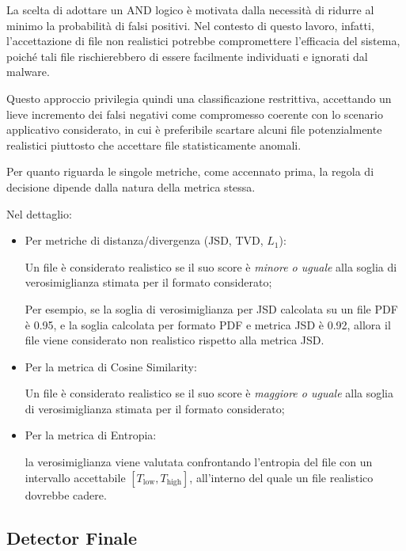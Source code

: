 \documentclass{report}
\begin{document}
\bigskip

La scelta di adottare un AND logico è motivata dalla necessità di ridurre al minimo la probabilità di falsi positivi.
Nel contesto di questo lavoro, infatti, l’accettazione di file non realistici potrebbe
compromettere l’efficacia del sistema, poiché tali file rischierebbero di essere facilmente individuati
e ignorati dal malware.

\bigskip

Questo approccio privilegia quindi una classificazione restrittiva, accettando un lieve incremento dei falsi negativi
come compromesso coerente con lo scenario applicativo considerato, in cui è preferibile scartare alcuni file
potenzialmente realistici piuttosto che accettare file statisticamente anomali.


\bigskip

Per quanto riguarda le singole metriche, come accennato prima, la regola di decisione dipende dalla natura della metrica stessa.

Nel dettaglio:
\begin{itemize}

    \item Per metriche di distanza/divergenza (JSD, TVD, $L_1$):

Un file è considerato realistico se il suo score è \emph{minore o uguale} alla soglia di
verosimiglianza stimata per il formato considerato;

Per esempio, se la soglia di verosimiglianza per JSD calcolata su un file PDF è 0.95, e la soglia calcolata per formato PDF e metrica JSD è 0.92,
allora il file viene considerato non realistico rispetto alla metrica JSD.

    \item Per la metrica di Cosine Similarity:

Un file è considerato realistico se il suo score è \emph{maggiore o uguale} alla soglia di
verosimiglianza stimata per il formato considerato;

    \item Per la metrica di Entropia:

la verosimiglianza viene valutata confrontando l'entropia del file con un intervallo accettabile $[T_{\text{low}}, T_{\text{high}}]$,
all'interno del quale un file realistico dovrebbe cadere.



\end{itemize}



\subsection{Detector Finale}
\end{document}
